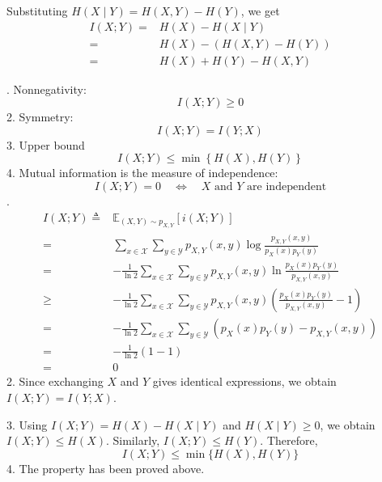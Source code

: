 \documentclass[11pt]{report}
\theoremstyle{lecturedefinition}
\theoremstyle{lectureremark}
\begin{document}
Substituting $H(X\mid Y)=H(X,Y) - H(Y)$, we get
\begin{equation*}
\begin{aligned}
    I(X;Y)=&H(X)-H(X\mid Y)\\
    =&H(X)-(H(X,Y)-H(Y))\\
    =& H(X)+H(Y)-H(X,Y)
\end{aligned}
\end{equation*}
\begin{property}
. Nonnegativity:
\begin{equation*}
    I(X;Y)\ge 0
\end{equation*}
2. Symmetry:
\begin{equation*}
    I(X;Y)=I(Y;X)
\end{equation*}
3. Upper bound
\begin{equation*}
    I(X;Y)\le \min\left\{H(X), H(Y)\right\}
\end{equation*}
4. Mutual information is the measure of independence:
\begin{equation*}
    I(X;Y)=0\quad \Longleftrightarrow \quad X\text{ and } Y\text{ are independent}
\end{equation*}
\tcblower
{}. 
\begin{equation*}
    \begin{aligned}
        I(X;Y)\triangleq& \mathbb{E}_{(X,Y)\sim p_{X,Y}}[i(X;Y)] \\
        =&\sum_{x\in\mathcal{X}}\sum_{y\in\mathcal{Y}}p_{X,Y}(x,y)\log\frac{p_{X,Y}(x,y)}{p_X(x)p_Y(y)}\\
        =&-\frac{1}{\ln2}\sum_{x\in\mathcal{X}}\sum_{y\in\mathcal{Y}}p_{X,Y}(x,y)\ln\frac{p_X(x)p_Y(y)}{p_{X,Y}(x,y)}\\
        \ge &-\frac{1}{\ln2}\sum_{x\in\mathcal{X}}\sum_{y\in\mathcal{Y}}p_{X,Y}(x,y)\left(\frac{p_X(x)p_Y(y)}{p_{X,Y}(x,y)}-1\right)\\
        =&-\frac{1}{\ln2}\sum_{x\in\mathcal{X}}\sum_{y\in\mathcal{Y}}(p_X(x)p_Y(y)-p_{X,Y}(x,y))\\
        =&-\frac{1}{\ln2}(1-1)\\
        =&0
    \end{aligned}
\end{equation*}
2. Since exchanging $X$ and $Y$ gives identical expressions, we obtain $I(X;Y)=I(Y;X)$.

3. Using $I(X;Y)=H(X)-H(X\mid Y)$ and $H(X\mid Y)\ge 0$, we obtain $I(X;Y)\le H(X)$. Similarly, $I(X;Y)\le H(Y)$. Therefore,
\begin{equation*}
    I(X;Y)\le \min\{H(X),H(Y)\}
\end{equation*}
4. The property has been proved above.
\end{property}
\end{document}
